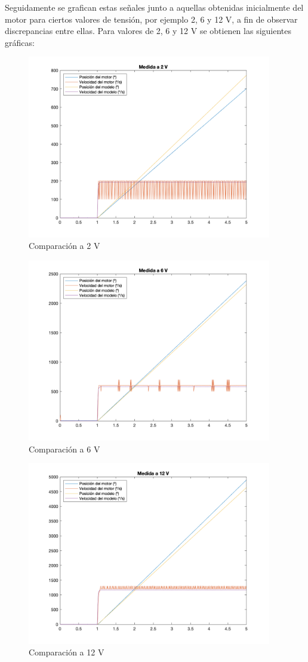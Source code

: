 \documentclass[a4paper, 12pt]{article}
\begin{document}
Seguidamente se grafican estas señales junto a aquellas obtenidas inicialmente del motor para ciertos valores de tensión, por ejemplo 2, 6 y 12 V, 
a fin de observar discrepancias entre ellas. Para valores de 2, 6 y 12 V se obtienen las siguientes gráficas:\\
\begin{figure}[h!] 
	\centering
	\includegraphics[height=8cm]{figs/p2/v02} 
	\caption{Comparación a 2 V} \label{comp02}
\end{figure}
\begin{figure}[h!]
	\centering
	\includegraphics[height=8cm]{figs/p2/v06} 
	\caption{Comparación a 6 V} \label{comp06}
\end{figure}
\begin{figure}[h!]
	\centering
	\includegraphics[height=8cm]{figs/p2/v12}
	\caption{Comparación a 12 V}  \label{comp12}
\end{figure}
\end{document}
